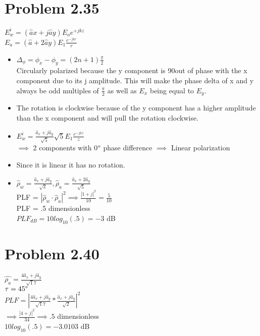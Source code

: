 \documentclass[a4paper,15pt]{article}
\theoremstyle{mytheor}
\begin{document}
\section*{Problem 2.35}
    \begin{center}
    $E^i_w = (\hat{a} x + j \hat{a} y) E_o e^{+jkz}$\\
    $E_a=(\hat{a}+2\hat{a}y)E_1\frac{e^{-jkr}}{r}$\\
    \begin{itemize}
    \item $\Delta_\phi = \phi_x - \phi_y = (2n+1)\frac{\pi}{2}$\\
    Circularly polarized because the y component is 90\degree out of phase with the x component due to its j amplitude. This will make the phase delta of x and y always be odd multiples of $\frac{\pi}{2}$ as well as $E_{x}$ being equal to $E_{y}$.\\
    \item The rotation is clockwise because of the y component has a higher amplitude than the x component and will pull the rotation clockwise.
    \item 
        $E^i_w = \frac{\hat{a}_x+j\hat{a}_y}{\sqrt5} \sqrt5 E_1 \frac{e^{-jkz}}{z} $\\
        $\implies $ 2 components with 0$\degree$ phase difference $\implies$ Linear polarization\\
        
    \item Since it is linear it has no rotation. \\
    
    \item 
        $\hat{\rho}_w = \frac{\hat{a}_x + j\hat{a}_y}{\sqrt2} , \hat{\rho}_a = 
                                    \frac{\hat{a}_x + 2\hat{a}_y}{\sqrt5} $\\
                                    
        PLF = $|\hat{\rho}_w \cdot \hat{\rho}_a|^2 \implies \frac{|1+j|^2}{10} = \frac{5}{10}$\\
        PLF = .5 dimensionless\\
        $PLF_{dB} = 10log_{10}(.5) = -3$ dB\\
    
    \end{itemize}
    \end{center}
    

\section*{Problem 2.40}
    $\hat{\rho_a} = \frac{4\hat{a}_x + j\hat{a}_y}{\sqrt17}$\\
    $\tau = 45\degree$\\
    $PLF = |\frac{4\hat{a}_x + j\hat{a}_y}{\sqrt17} * \frac{\hat{a}_x + j\hat{a}_y}{\sqrt2}|^2$\\
    $ \implies \frac{|4+j|^2}{34} \implies .5$ dimensionless\\
    $10log_{10}(.5) = -3.0103$ dB\\
\pagebreak
\end{document}
